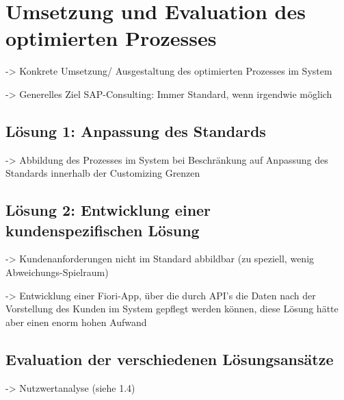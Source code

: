 \chapter{Umsetzung und Evaluation des optimierten Prozesses}

-> Konkrete Umsetzung/ Ausgestaltung des optimierten Prozesses im System 

-> Generelles Ziel SAP-Consulting: Immer Standard, wenn irgendwie möglich

\section{Lösung 1: Anpassung des Standards}

-> Abbildung des Prozesses im System bei Beschränkung auf Anpassung des Standards innerhalb der Customizing Grenzen

\section{Lösung 2: Entwicklung einer kundenspezifischen Lösung}

-> Kundenanforderungen nicht im Standard abbildbar (zu speziell, wenig Abweichungs-Spielraum)

-> Entwicklung einer Fiori-App, über die durch API's die Daten nach der Vorstellung des Kunden im System gepflegt werden können, diese Lösung hätte aber einen enorm hohen Aufwand

\section{Evaluation der verschiedenen Lösungsansätze}

-> Nutzwertanalyse (siehe 1.4)